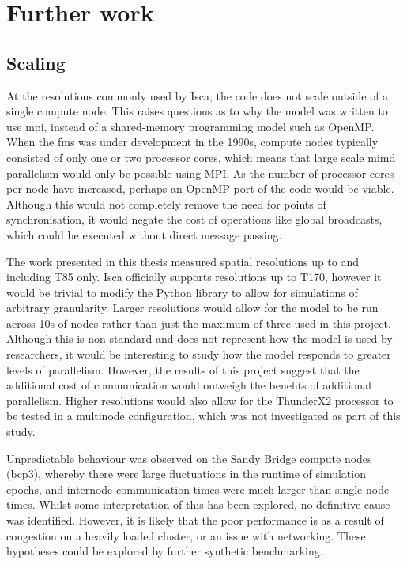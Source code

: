 \documentclass[a4paper,11pt]{report}
\begin{document}
\section{Further work}
\subsection{Scaling}
At the resolutions commonly used by Isca, the code does not scale outside of a single compute node. This raises questions as to why the model was written to use \gls{mpi}, instead of a shared-memory programming model such as OpenMP. When the \gls{fms} was under development in the 1990s, compute nodes typically consisted of only one or two processor cores, which means that large scale \gls{mimd} parallelism would only be possible using MPI. As the number of processor cores per node have increased, perhaps an OpenMP port of the code would be viable. Although this would not completely remove the need for points of synchronisation, it would negate the cost of operations like global broadcasts, which could be executed without direct message passing. 
\par
The work presented in this thesis measured spatial resolutions up to and including T85 only. Isca officially supports resolutions up to T170, however it would be trivial to modify the Python library to allow for simulations of arbitrary granularity. Larger resolutions would allow for the model to be run across 10s of nodes rather than just the maximum of three used in this project. Although this is non-standard and does not represent how the model is used by researchers, it would be interesting to study how the model responds to greater levels of parallelism. However, the results of this project suggest that the additional cost of communication would outweigh the benefits of additional parallelism. Higher resolutions would also allow for the ThunderX2 processor to be tested in a multinode configuration, which was not investigated as part of this study. 
\par
Unpredictable behaviour was observed on the Sandy Bridge compute nodes (\gls{bcp3}), whereby there were large fluctuations in the runtime of simulation epochs, and internode communication times were much larger than single node times. Whilst some interpretation of this has been explored, no definitive cause was identified. However, it is likely that the poor performance is as a result of congestion on a heavily loaded cluster, or an issue with networking. These hypotheses could be explored by further synthetic benchmarking.
\end{document}
